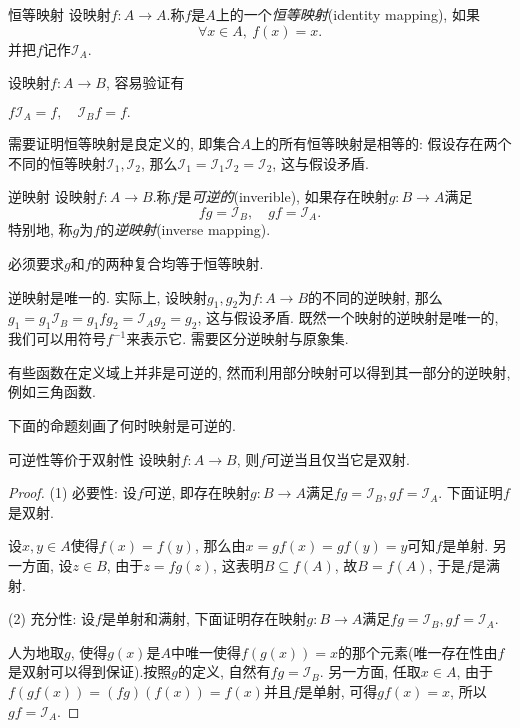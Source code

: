 \begin{definition}{恒等映射}
	设映射$f: A \to A$.称$f$是$A$上的一个\textit{恒等映射}(identity mapping), 如果$$\forall x\in A, ~f(x)=x.$$
	并把$f$记作$\mathcal{I}_A$.
\end{definition}
\begin{remark}
	设映射$f :  A \to B$, 容易验证有
	\begin{center}
		$f\mathcal{I}_A=f, \quad \mathcal{I}_Bf=f.$
	\end{center}
\end{remark}
\begin{remark}
	需要证明恒等映射是良定义的, 即集合$A$上的所有恒等映射是相等的: 假设存在两个不同的恒等映射$\mathcal{I}_1, \mathcal{I}_2$, 那么$\mathcal{I}_1 = \mathcal{I}_1 \mathcal{I}_2 = \mathcal{I}_2$, 这与假设矛盾.
\end{remark}

\begin{definition}{逆映射}
	设映射$f: A \to B$.称$f$是\textit{可逆的}(inverible), 如果存在映射$g: B \to A$满足$$fg=\mathcal{I}_B, \quad gf=\mathcal{I}_A.$$
	特别地, 称$g$为$f$的\textit{逆映射}(inverse mapping).
\end{definition}
\begin{remark}
	必须要求$g$和$f$的两种复合均等于恒等映射. 
\end{remark}

逆映射是唯一的. 实际上, 设映射$g_1, g_2$为$f: A \to B$的不同的逆映射, 那么$g_1 = g_1\mathcal{I}_B = g_1fg_2 = \mathcal{I}_Ag_2 = g_2$, 这与假设矛盾. 既然一个映射的逆映射是唯一的, 我们可以用符号$f^{-1}$来表示它. 需要区分逆映射与原象集.

有些函数在定义域上并非是可逆的, 然而利用部分映射可以得到其一部分的逆映射, 例如三角函数.

下面的命题刻画了何时映射是可逆的.

\begin{proposition}{可逆性等价于双射性}
	设映射$f: A \to B$, 则$f$可逆当且仅当它是双射.
\end{proposition}
\begin{proof}
	(1) 必要性: 设$f$可逆, 即存在映射$g: B \to A$满足$fg=\mathcal{I}_B, gf=\mathcal{I}_A$. 下面证明$f$是双射. 
	
	设$x, y \in A$使得$f(x)=f(y)$, 那么由$x=gf(x)=gf(y)=y$可知$f$是单射. 另一方面, 设$z \in B$, 由于$z=fg(z)$, 这表明$B \subseteq f(A)$, 故$B = f(A)$, 于是$f$是满射. 
	
	(2) 充分性: 设$f$是单射和满射, 下面证明存在映射$g: B \to A$满足$fg=\mathcal{I}_B, gf=\mathcal{I}_A$. 
	
	人为地取$g$, 使得$g(x)$是$A$中唯一使得$f(g(x))=x$的那个元素(唯一存在性由$f$是双射可以得到保证).按照$g$的定义, 自然有$fg=\mathcal{I}_B$. 另一方面, 任取$x \in A$, 由于$f(gf(x)) = (fg)(f(x)) = f(x)$并且$f$是单射, 可得$gf(x)=x$, 所以$gf=\mathcal{I}_A$.
\end{proof}

